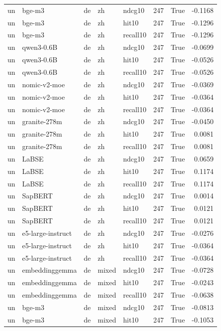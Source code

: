 \begin{tabular}{lllllrrr}
un & bge-m3 & de & zh & ndcg10 & 247 & True & -0.1168 \\
un & bge-m3 & de & zh & hit10 & 247 & True & -0.1296 \\
un & bge-m3 & de & zh & recall10 & 247 & True & -0.1296 \\
un & qwen3-0.6B & de & zh & ndcg10 & 247 & True & -0.0699 \\
un & qwen3-0.6B & de & zh & hit10 & 247 & True & -0.0526 \\
un & qwen3-0.6B & de & zh & recall10 & 247 & True & -0.0526 \\
un & nomic-v2-moe & de & zh & ndcg10 & 247 & True & -0.0369 \\
un & nomic-v2-moe & de & zh & hit10 & 247 & True & -0.0364 \\
un & nomic-v2-moe & de & zh & recall10 & 247 & True & -0.0364 \\
un & granite-278m & de & zh & ndcg10 & 247 & True & -0.0450 \\
un & granite-278m & de & zh & hit10 & 247 & True & 0.0081 \\
un & granite-278m & de & zh & recall10 & 247 & True & 0.0081 \\
un & LaBSE & de & zh & ndcg10 & 247 & True & 0.0659 \\
un & LaBSE & de & zh & hit10 & 247 & True & 0.1174 \\
un & LaBSE & de & zh & recall10 & 247 & True & 0.1174 \\
un & SapBERT & de & zh & ndcg10 & 247 & True & 0.0014 \\
un & SapBERT & de & zh & hit10 & 247 & True & 0.0121 \\
un & SapBERT & de & zh & recall10 & 247 & True & 0.0121 \\
un & e5-large-instruct & de & zh & ndcg10 & 247 & True & -0.0276 \\
un & e5-large-instruct & de & zh & hit10 & 247 & True & -0.0364 \\
un & e5-large-instruct & de & zh & recall10 & 247 & True & -0.0364 \\
un & embeddinggemma & de & mixed & ndcg10 & 247 & True & -0.0728 \\
un & embeddinggemma & de & mixed & hit10 & 247 & True & -0.0243 \\
un & embeddinggemma & de & mixed & recall10 & 247 & True & -0.0638 \\
un & bge-m3 & de & mixed & ndcg10 & 247 & True & -0.0813 \\
un & bge-m3 & de & mixed & hit10 & 247 & True & -0.1053 \\

\end{tabular}
